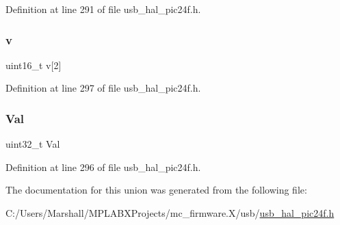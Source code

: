 Definition at line 291 of file usb\+\_\+hal\+\_\+pic24f.\+h.

\mbox{\label{union_____b_d_t_ad3333479e5f03245d832c5d7e29f313f}} 
\subsubsection{\texorpdfstring{v}{v}}
{\footnotesize\ttfamily uint16\+\_\+t v\mbox{[}2\mbox{]}}



Definition at line 297 of file usb\+\_\+hal\+\_\+pic24f.\+h.

\mbox{\label{union_____b_d_t_a4497b7ccdd35adfe3656ecc961faad01}} 
\subsubsection{\texorpdfstring{Val}{Val}}
{\footnotesize\ttfamily uint32\+\_\+t Val}



Definition at line 296 of file usb\+\_\+hal\+\_\+pic24f.\+h.



The documentation for this union was generated from the following file\+:\begin{DoxyCompactItemize}
\item 
C\+:/\+Users/\+Marshall/\+M\+P\+L\+A\+B\+X\+Projects/mc\+\_\+firmware.\+X/usb/\mbox{\hyperlink{usb__hal__pic24f_8h}{usb\+\_\+hal\+\_\+pic24f.\+h}}\end{DoxyCompactItemize}
